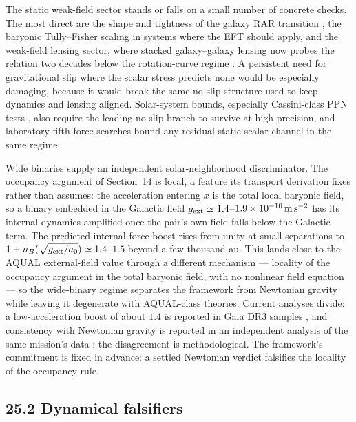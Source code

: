 \documentclass[11pt]{article}
\begin{document}
The static weak-field sector stands or falls on a small number of concrete checks. The most direct are the shape and tightness of the galaxy RAR transition \citep{McGaugh2016,Lelli2016}, the baryonic Tully--Fisher scaling in systems where the EFT should apply, and the weak-field lensing sector, where stacked galaxy--galaxy lensing now probes the relation two decades below the rotation-curve regime \citep{Brouwer2021}. A persistent need for gravitational slip where the scalar stress predicts none would be especially damaging, because it would break the same no-slip structure used to keep dynamics and lensing aligned. Solar-system bounds, especially Cassini-class PPN tests \citep{Bertotti2003,Will2014}, also require the leading no-slip branch to survive at high precision, and laboratory fifth-force searches \citep{Adelberger2003} bound any residual static scalar channel in the same regime.

Wide binaries supply an independent solar-neighborhood discriminator. The occupancy argument of Section~14 is local, a feature its transport derivation fixes rather than assumes: the acceleration entering $x$ is the total local baryonic field, so a binary embedded in the Galactic field $g_{\rm ext}\simeq1.4$--$1.9\times10^{-10}\,{\rm m\,s^{-2}}$ has its internal dynamics amplified once the pair's own field falls below the Galactic term. The predicted internal-force boost rises from unity at small separations to $1+n_B(\sqrt{g_{\rm ext}/a_0})\simeq1.4$--$1.5$ beyond a few thousand au. This lands close to the AQUAL external-field value through a different mechanism --- locality of the occupancy argument in the total baryonic field, with no nonlinear field equation --- so the wide-binary regime separates the framework from Newtonian gravity while leaving it degenerate with AQUAL-class theories. Current analyses divide: a low-acceleration boost of about $1.4$ is reported in Gaia DR3 samples \citep{Chae2023}, and consistency with Newtonian gravity is reported in an independent analysis of the same mission's data \citep{Banik2024}; the disagreement is methodological. The framework's commitment is fixed in advance: a settled Newtonian verdict falsifies the locality of the occupancy rule.

\subsection{25.2 Dynamical falsifiers}
\end{document}
